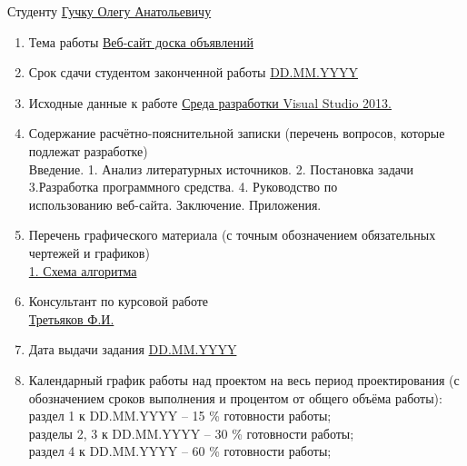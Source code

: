\documentclass[14pt,a4paper]{extreport}
\begin{document}
	\raggedright
	Студенту \underline{Гучку Олегу Анатольевичу}\\
	\begin{enumerate}
	\item Тема работы \underline{Веб-сайт доска объявлений}\\ 
	\item Срок сдачи студентом законченной работы \underline{DD.MM.YYYY}
	\item Исходные данные к работе \underline{Среда разработки Visual Studio 2013. }
	\item Содержание расчётно-пояснительной записки (перечень вопросов, которые подлежат разработке)\\
	\underline{\hspace*{16cm}}\hspace*{-16cm}Введение. 1. Анализ литературных источников. 2. Постановка задачи\\
	\underline{\hspace*{16cm}}\hspace*{-16cm}3.Разработка программного средства. 4. Руководство по \\
	\underline{\hspace*{16cm}}\hspace*{-16cm}использованию веб-сайта. Заключение. Приложения.
	\item Перечень графического материала (с точным обозначением обязательных чертежей и графиков)\\
	\underline{1. Схема алгоритма}
	\item Консультант по курсовой работе\\
	\underline{Третьяков Ф.И.}  
	\item Дата выдачи задания \underline{DD.MM.YYYY}
	\item Календарный график работы над проектом на весь период проектирования (с обозначением сроков выполнения и процентом от общего объёма работы):\\
	\underline{\hspace*{16cm}}\hspace*{-16cm}раздел 1 к DD.MM.YYYY – 15 \% готовности работы;\\  
	\underline{\hspace*{16cm}}\hspace*{-16cm}разделы 2, 3 к DD.MM.YYYY – 30 \% готовности работы;\\ 
	\underline{\hspace*{16cm}}\hspace*{-16cm}раздел 4 к DD.MM.YYYY – 60 \% готовности работы;\\

\end{enumerate}
\end{document}
